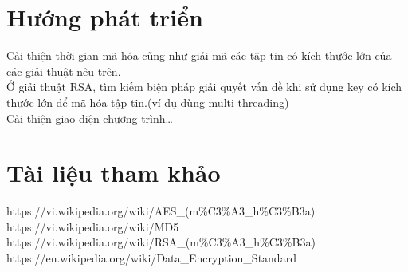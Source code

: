 \documentclass[paper=a4, fontsize=11pt]{scrartcl}	%
\numberwithin{equation}{section}															%
\numberwithin{figure}{section}																%
\numberwithin{table}{section}																%
\begin{document}
	
\section{Hướng phát triển}
	Cải thiện thời gian mã hóa cũng như giải mã các tập tin có kích thước lớn của các giải thuật nêu trên.\\
	
Ở giải thuật RSA, tìm kiếm biện pháp giải quyết vấn đề khi sử dụng key có kích thước lớn để mã hóa tập tin.(ví dụ dùng multi-threading)\\

Cải thiện giao diện chương trình…

\section{Tài liệu tham khảo}

https://vi.wikipedia.org/wiki/AES\_(m\%C3\%A3\_h\%C3\%B3a)\\
https://vi.wikipedia.org/wiki/MD5\\
https://vi.wikipedia.org/wiki/RSA\_(m\%C3\%A3\_h\%C3\%B3a)\\
https://en.wikipedia.org/wiki/Data_Encryption_Standard\\


	
\end{document}

